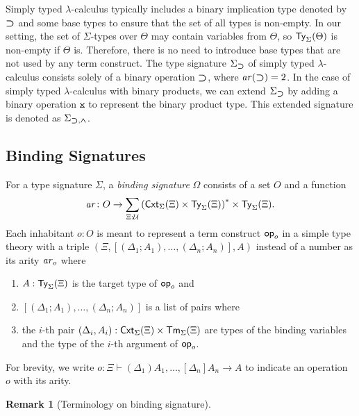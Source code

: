 \documentclass[acmsmall]{acmart}
\theoremstyle{acmdefinition}
\newtheorem{remark}[theorem]{Remark}}
\begin{document}
\begin{example}\label{ex:implication}
  Simply typed $\lambda$-calculus typically includes a binary implication type denoted by $\mathbin{\bm{\supset}}$ and some base types to ensure that the set of all types is non-empty.
  In our setting, the set of $\Sigma$-types over $\Theta$ may contain variables from $\Theta$, so $\mathsf{Ty}_{\Sigma}(\Theta)$ is non-empty if $\Theta$ is.
  Therefore, there is no need to introduce base types that are not used by any term construct.
  The type signature $\Sigma_{\mathbin{\bm{\supset}}}$ of simply typed $\lambda$-calculus consists solely of a binary operation $\mathbin{\bm{\supset}}$, where $\mathit{ar}(\mathbin{\bm{\supset}}) = 2$.
  In the case of simply typed $\lambda$-calculus with binary products, we can extend $\Sigma_{\mathbin{\bm{\supset}}}$ by adding a binary operation $\btimes$ to represent the binary product type.
  This extended signature is denoted as $\Sigma_{\mathbin{\bm{\supset}}, \mathbin{\bm{\wedge}}}$.
\end{example}


\subsection{Binding Signatures}
\begin{definition}\label{def:binding-signature}
  For a type signature $\Sigma$, a \emph{binding signature} $\Omega$ consists of a set $O$ and a function
  \[
    \mathit{ar}\colon O \to \sum_{\Xi : \mathcal{U}} \left(\mathsf{Cxt}_\Sigma(\Xi) \times \mathsf{Ty}_\Sigma(\Xi)\right)^* \times \mathsf{Ty}_\Sigma(\Xi).
  \]
  Each inhabitant $o: O$ is meant to represent a term construct $\mathsf{op}_o$ in a simple type theory with a triple $\left(\Xi, \left[\left(\Delta_1; A_1\right), \ldots, \left(\Delta_{n}; A_{n}\right) \right], A\right)$
  instead of a number as its arity $\mathit{ar}_o$ where
  \begin{enumerate}
    \item $A : \mathsf{Ty}_\Sigma(\Xi)$ is the target type of $\mathsf{op}_o$ and
    \item $\left[\left(\Delta_1; A_{1}\right), \ldots, \left(\Delta_{n}; A_{n}\right) \right]$ is a list of pairs where
    \item the $i$-th pair $(\Delta_i, A_i) :\mathsf{Cxt}_{\Sigma}(\Xi) \times \mathsf{Tm}_{\Sigma}(\Xi)$ are types of the binding variables and the type of the $i$-th argument of $\mathsf{op}_{o}$.
  \end{enumerate}
  For brevity, we write $o \colon \Xi \vdash (\Delta_1)A_{1}, \ldots, \left[\Delta_{n}\right] A_{n} \to A$ to indicate an operation $o$ with its arity. 
\end{definition}
\begin{remark}[Terminology on binding signature]
  \cite{Aczel1978,Fiore2010}
\end{remark}
\end{document}
